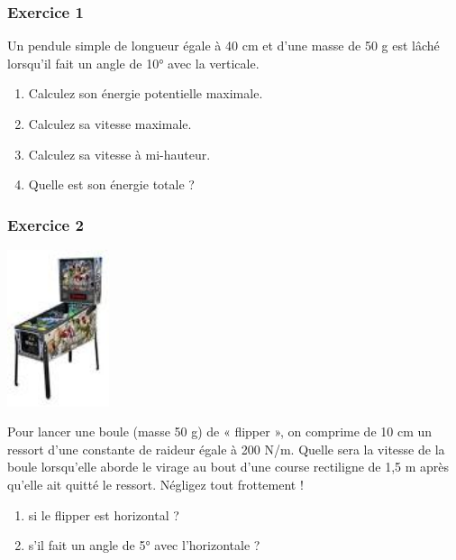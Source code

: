 \begin{multicols}{2}
\subsubsection{Exercice 1}
Un pendule simple de longueur égale à 40 cm et d’une masse de 50 g est lâché lorsqu’il fait un angle de 10° avec la
verticale. 

\begin{enumerate}
\item Calculez son énergie potentielle maximale.
\item Calculez sa vitesse maximale.
\item Calculez sa vitesse à mi-hauteur. 
\item Quelle est son énergie totale ? 
\end{enumerate}
\subsubsection[Exercice 2]{Exercice 2}
\begin{center}
\begin{minipage}{3.81cm}
 \includegraphics[width=3cm]{COURS2EnergieOHEXERCRESOL-img/COURS2EnergieOHEXERCRESOL-img003.png} 
\end{minipage}
\end{center}
Pour lancer une boule (masse 50 g) de « flipper », on comprime de 10 cm un ressort d’une constante de  raideur égale à
200 N/m. Quelle sera la vitesse de la boule lorsqu’elle aborde le virage au bout d’une course rectiligne de 1,5 m après
qu’elle ait quitté le ressort. Négligez tout frottement !

\begin{enumerate}
\item si le flipper est horizontal ? 
\item s’il fait un angle de 5° avec l’horizontale ?
\end{enumerate}

\end{multicols}
